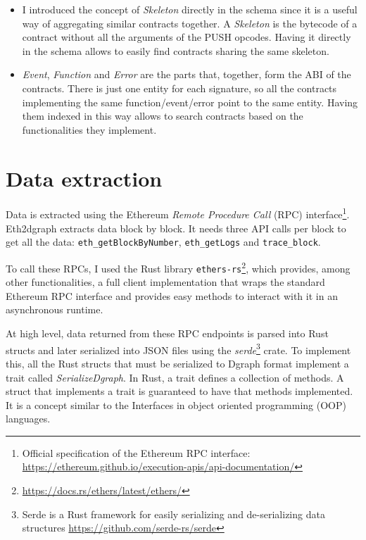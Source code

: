 \begin{itemize}
    \item I introduced the concept of \textit{Skeleton} directly in the schema since it is a useful way of aggregating similar contracts together. A \textit{Skeleton} is the bytecode of a contract without all the arguments of the PUSH opcodes. Having it directly in the schema allows to easily find contracts sharing the same skeleton.

    \item \textit{Event}, \textit{Function} and \textit{Error} are the parts that, together, form the ABI of the contracts. There is just one entity for each signature, so all the contracts implementing the same function/event/error point to the same entity. Having them indexed in this way allows to search contracts based on the functionalities they implement.
    
\end{itemize}

\section{Data extraction}

Data is extracted using the Ethereum \textit{Remote Procedure Call} (RPC) interface\footnote{Official specification of the Ethereum RPC interface: \url{https://ethereum.github.io/execution-apis/api-documentation/}}. Eth2dgraph extracts data block by block. It needs three API calls per block to get all the data: \texttt{eth\_getBlockByNumber}, \texttt{eth\_getLogs} and \texttt{trace\_block}. 

To call these RPCs, I used the Rust library \texttt{ethers-rs}\footnote{\url{https://docs.rs/ethers/latest/ethers/}}, which provides, among other functionalities, a full client implementation that wraps the standard Ethereum RPC interface and provides easy methods to interact with it in an asynchronous runtime.

At high level, data returned from these RPC endpoints is parsed into Rust structs and later serialized into JSON files using the \textit{serde}\footnote{Serde is a Rust framework for easily serializing and de-serializing data structures \url{https://github.com/serde-rs/serde}} crate. To implement this, all the Rust structs that must be serialized to Dgraph format implement a trait called \textit{SerializeDgraph}. In Rust, a trait defines a collection of methods. A struct that implements a trait is guaranteed to have that methods implemented. It is a concept similar to the Interfaces in object oriented programming (OOP) languages.

